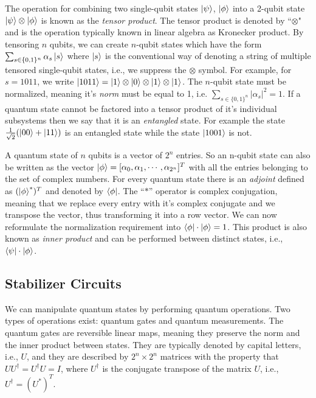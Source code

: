 \documentclass[runningheads]{llncs}
\begin{document}
The operation for combining two single-qubit states $\ket{\psi}$, $\ket{\phi}$ into a 2-qubit state $\ket{\psi}\otimes \ket{\phi}$  is known as the \textit{tensor product}. The tensor product is denoted by ``$\otimes$" and is the operation typically known in linear algebra as Kronecker product. By tensoring $n$ qubits, we can create $n$-qubit states which have the form $\sum_{s\in \{ 0,1 \}^{n} } \alpha_{s} \ket{s}$ where $\ket{s}$ is the conventional way of denoting a string of multiple tensored single-qubit states, i.e., we suppress the $\otimes$ symbol. For example, for $s=1011$, we write $\ket{1011}=\ket{1}\otimes \ket{0} \otimes \ket{1} \otimes \ket{1} $. The $n$-qubit state must be normalized, meaning it's \textit{norm} must be equal to 1, i.e. $\sum_{s\in \{0,1\}^{n} } | \alpha_{s} |^{2}=1 $. If a quantum state cannot be factored into a tensor product of it's individual subsystems then we say that it is an \textit{entangled} state. For example the state $\frac{1}{\sqrt{2}}(\ket{00}+\ket{11})$ is an entangled state while the state $\ket{1001}$ is not.

A quantum state of $n$ qubits is a vector of $2^n$ entries. So an n-qubit state can also be written as the vector $\ket{\phi}=[\alpha_0,\alpha_1,\cdots,\alpha_{2^n}]^T$ with all the entries belonging to the set of complex numbers. For every quantum state there is an \textit{adjoint} defined as $(\ket{\phi}^*)^T$ and denoted by $\bra{\phi}$. The ``$*$'' operator is complex conjugation, meaning that we replace every entry with it's complex conjugate and we transpose the vector, thus transforming it into a row vector. We can now reformulate the normalization requirement into $\bra{\phi}\cdot \ket{\phi}=1$. This product is also known as \textit{inner product} and can be performed between distinct states, i.e., $\bra{\psi}\cdot \ket{\phi}$.

\subsection{Stabilizer Circuits}\label{sec:stabilizer}

We can manipulate quantum states by performing quantum operations. Two types of operations exist: quantum gates and quantum measurements. The quantum gates are reversible linear maps, meaning they preserve the norm and the inner product between states. They are typically denoted by capital letters, i.e., $U$, and they are described by $2^n\times 2^n$ matrices with the property that $UU^{\dagger}=U^{\dagger}U=I$, where $U^{\dagger}$ is the conjugate transpose of the matrix $U$, i.e., $U^{\dagger}=(U^*)^T$.
\end{document}
